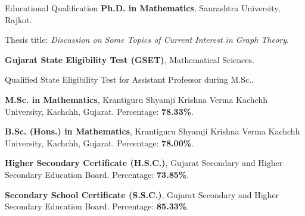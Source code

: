 \begin{rubric}{Educational Qualification}
\entry*[Jan 2026]%
    \textbf{Ph.D. in Mathematics}, Saurashtra University, Rajkot.\par
    Thesis title: \emph{Discussion on Some Topics of Current Interest in Graph Theory}.

\entry*[Mar 2020]%
    \textbf{Gujarat State Eligibility Test (GSET)}, Mathematical Sciences.\par
    Qualified State Eligibility Test for Assistant Professor during M.Sc..

\entry*[2018 -- 2020]%
    \textbf{M.Sc. in Mathematics}, Krantiguru Shyamji Krishna Verma Kachchh University, Kachchh, Gujarat.
    Percentage: \textbf{78.33\%}.

\entry*[2015 -- 2018]%
    \textbf{B.Sc. (Hons.) in Mathematics}, Krantiguru Shyamji Krishna Verma Kachchh University, Kachchh, Gujarat.
    Percentage: \textbf{78.00\%}.

\entry*[2015]%
    \textbf{Higher Secondary Certificate (H.S.C.)}, Gujarat Secondary and Higher Secondary Education Board.
    Percentage: \textbf{73.85\%}.

\entry*[2013]%
    \textbf{Secondary School Certificate (S.S.C.)}, Gujarat Secondary and Higher Secondary Education Board.
    Percentage: \textbf{85.33\%}.
\end{rubric}
